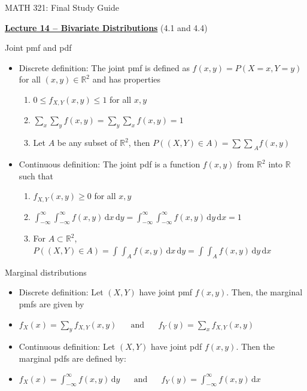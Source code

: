 \documentclass{article}
\newcommand{\bu}[1]{\textbf{\ul{#1}}}				%
\newcommand{\integral}[4]{\displaystyle \int_{#1}^{#2} #3 \,\mathrm{d} #4}		%
\begin{document}
\begin{center}
{\Huge MATH 321: Final Study Guide}

\end{center}

\bigskip\bigskip

{\large \bu{Lecture 14 -- Bivariate Distributions}} (4.1 and 4.4)\bigskip

Joint pmf and pdf
\begin{itemize}
    \item Discrete definition: The joint pmf is defined as $f(x,y) = P(X = x, Y = y)$ for all $(x, y) \in \mathbb{R}^2$ and has properties
    \begin{enumerate}
        \item $0 \le f_{X,Y}(x,y) \le 1$ \quad for all $x, y$
        \item $\displaystyle \sum_x \sum_y f(x,y) = \sum_y \sum_x f(x,y) = 1$
        \item Let $A$ be any subset of $\mathbb{R}^2$, then $\displaystyle P((X,Y) \in A) = {\sum \sum}_A f(x,y)$
    \end{enumerate}
    \item Continuous definition: The joint pdf is a function $f(x,y)$ from $\mathbb{R}^2$ into $\mathbb{R}$ such that
    \begin{enumerate}
        \item $f_{X,Y}(x,y) \ge 0$ \quad for all $x, y$
        \item $\integral{-\infty}{\infty}{\integral{-\infty}{\infty}{f(x,y)}{x}}{y} = \integral{-\infty}{\infty}{\integral{-\infty}{\infty}{f(x,y)}{y}}{x} = 1$
        \item For $A \subset \mathbb{R}^2$, $\displaystyle P((X,Y) \in A) = \integral{}{}{\integral{A}{}{f(x,y)}{x}}{y} = \integral{}{}{\integral{A}{}{f(x,y)}{y}}{x}$
    \end{enumerate}
\end{itemize}\bigskip

Marginal distributions
\begin{itemize}
    \item Discrete definition: Let $(X,Y)$ have joint pmf $f(x,y)$. Then, the marginal pmfs are given by
    \item[] $\displaystyle f_X(x) = \sum_y f_{X,Y}(x,y) \hspace{20pt} \text{and} \hspace{20pt} f_Y(y) = \sum_x f_{X,Y}(x,y)$
    \item Continuous definition: Let $(X,Y)$ have joint pdf $f(x,y)$. Then the marginal pdfs are defined by:
    \item[] $f_X(x) = \integral{-\infty}{\infty}{f(x,y)}{y} \hspace{20pt} \text{and} \hspace{20pt} f_Y(y) = \integral{-\infty}{\infty}{f(x,y)}{x}$
\end{itemize}\bigskip
\end{document}
